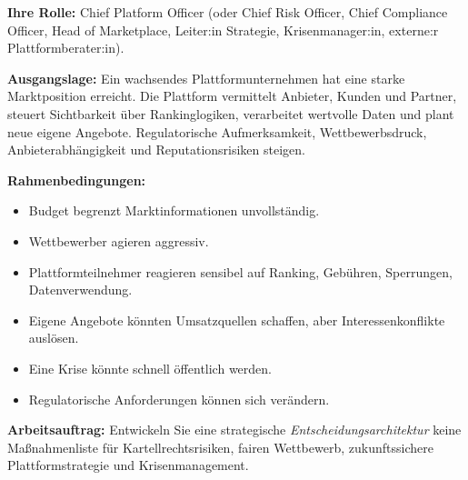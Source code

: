 \documentclass[11pt,a4paper,oneside]{article}
\begin{document}
\begin{infobox}
\textbf{Ihre Rolle:} Chief Platform Officer (oder Chief Risk Officer, Chief Compliance Officer, Head of Marketplace, Leiter:in Strategie, Krisenmanager:in, externe:r Plattformberater:in).

\smallskip
\textbf{Ausgangslage:} Ein wachsendes Plattformunternehmen hat eine starke Marktposition erreicht. Die Plattform vermittelt Anbieter, Kunden und Partner, steuert Sichtbarkeit über Rankinglogiken, verarbeitet wertvolle Daten und plant neue eigene Angebote. Regulatorische Aufmerksamkeit, Wettbewerbsdruck, Anbieterabhängigkeit und Reputationsrisiken steigen.

\smallskip
\textbf{Rahmenbedingungen:}
\begin{itemize}
  \item Budget begrenzt \textperiodcentered{} Marktinformationen unvollständig.
  \item Wettbewerber agieren aggressiv.
  \item Plattformteilnehmer reagieren sensibel auf Ranking, Gebühren, Sperrungen, Datenverwendung.
  \item Eigene Angebote könnten Umsatzquellen schaffen, aber Interessenkonflikte auslösen.
  \item Eine Krise könnte schnell öffentlich werden.
  \item Regulatorische Anforderungen können sich verändern.
\end{itemize}
\end{infobox}

\noindent\textbf{Arbeitsauftrag:} Entwickeln Sie eine strategische \emph{Entscheidungsarchitektur} \textendash{} keine Maßnahmenliste \textendash{} für Kartellrechtsrisiken, fairen Wettbewerb, zukunftssichere Plattformstrategie und Krisenmanagement.
\end{document}
